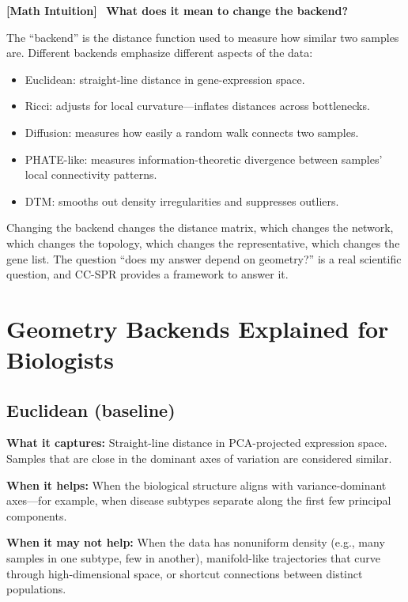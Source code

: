 \documentclass[11pt]{article}
\makeatletter
\newenvironment{mathbox}{%
  \par\vspace{8pt}\noindent\fboxrule=1pt\fboxsep=8pt%
  \begin{lrbox}{\@tempboxa}\begin{minipage}{\dimexpr\linewidth-2\fboxsep-2\fboxrule}%
  \small\textbf{[Math Intuition]}\ }%
  {\end{minipage}\end{lrbox}\colorbox{white}{\fcolorbox{blue!40!black}{white}{\usebox{\@tempboxa}}}\par\vspace{8pt}}
\makeatother
\begin{document}
\begin{mathbox}
\textbf{What does it mean to change the backend?}

The ``backend'' is the distance function used to measure how similar two samples are.
Different backends emphasize different aspects of the data:
\begin{itemize}[leftmargin=1em]
\item Euclidean: straight-line distance in gene-expression space.
\item Ricci: adjusts for local curvature---inflates distances across bottlenecks.
\item Diffusion: measures how easily a random walk connects two samples.
\item PHATE-like: measures information-theoretic divergence between samples' local connectivity patterns.
\item DTM: smooths out density irregularities and suppresses outliers.
\end{itemize}
Changing the backend changes the distance matrix, which changes the network, which changes the topology, which changes the representative, which changes the gene list.
The question ``does my answer depend on geometry?'' is a real scientific question, and CC-SPR provides a framework to answer it.
\end{mathbox}

\section{Geometry Backends Explained for Biologists}
\label{sec:backends}

\subsection{Euclidean (baseline)}

\textbf{What it captures:} Straight-line distance in PCA-projected expression space.
Samples that are close in the dominant axes of variation are considered similar.

\textbf{When it helps:} When the biological structure aligns with variance-dominant axes---for example, when disease subtypes separate along the first few principal components.

\textbf{When it may not help:} When the data has nonuniform density (e.g., many samples in one subtype, few in another), manifold-like trajectories that curve through high-dimensional space, or shortcut connections between distinct populations.
\end{document}

